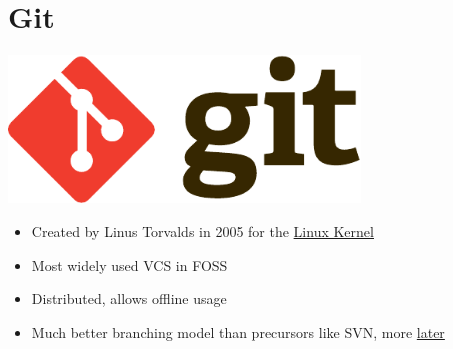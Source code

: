 
\section{Git}
\begin{frame}
    \centering
    \includegraphics[width=0.7\textwidth]{logos/git.pdf}

    \vspace{1em}

    \begin{itemize}
      \item Created by Linus Torvalds in 2005 for the \href{https://github.com/torvalds/linux}{Linux Kernel}
      \item Most widely used VCS in FOSS
      \item Distributed, allows offline usage
      \item Much better branching model than precursors like SVN, more \hyperlink{sec:comparison}{later}
    \end{itemize}
\end{frame}

